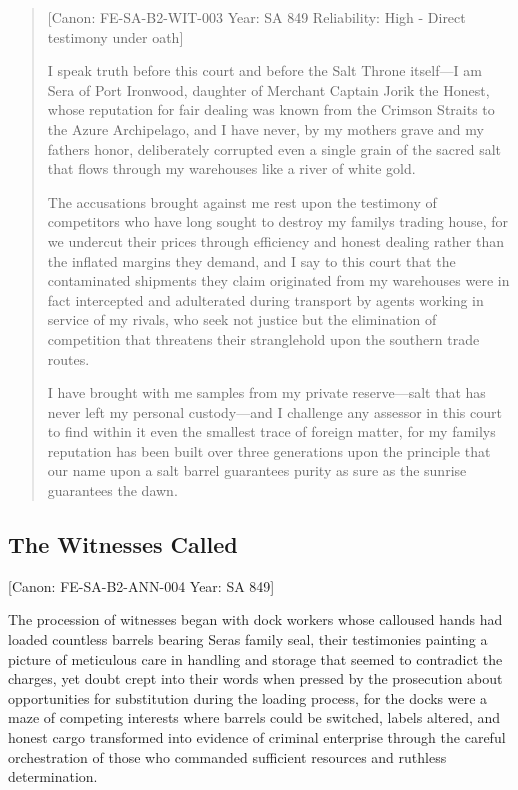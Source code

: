 \begin{quote}
{[}Canon: FE-SA-B2-WIT-003 \textbar{} Year: SA 849 \textbar{}
Reliability: High - Direct testimony under oath{]}

I speak truth before this court and before the Salt Throne itself---I am
Sera of Port Ironwood, daughter of Merchant Captain Jorik the Honest,
whose reputation for fair dealing was known from the Crimson Straits to
the Azure Archipelago, and I have never, by my mother\textquotesingle s
grave and my father\textquotesingle s honor, deliberately corrupted even
a single grain of the sacred salt that flows through my warehouses like
a river of white gold.

The accusations brought against me rest upon the testimony of
competitors who have long sought to destroy my family\textquotesingle s
trading house, for we undercut their prices through efficiency and
honest dealing rather than the inflated margins they demand, and I say
to this court that the contaminated shipments they claim originated from
my warehouses were in fact intercepted and adulterated during transport
by agents working in service of my rivals, who seek not justice but the
elimination of competition that threatens their stranglehold upon the
southern trade routes.

I have brought with me samples from my private reserve---salt that has
never left my personal custody---and I challenge any assessor in this
court to find within it even the smallest trace of foreign matter, for
my family\textquotesingle s reputation has been built over three
generations upon the principle that our name upon a salt barrel
guarantees purity as sure as the sunrise guarantees the dawn.
\end{quote}

\subsection{The Witnesses Called}\label{the-witnesses-called}

{[}Canon: FE-SA-B2-ANN-004 \textbar{} Year: SA 849{]}

The procession of witnesses began with dock workers whose calloused
hands had loaded countless barrels bearing Sera\textquotesingle s family
seal, their testimonies painting a picture of meticulous care in
handling and storage that seemed to contradict the charges, yet doubt
crept into their words when pressed by the prosecution about
opportunities for substitution during the loading process, for the docks
were a maze of competing interests where barrels could be switched,
labels altered, and honest cargo transformed into evidence of criminal
enterprise through the careful orchestration of those who commanded
sufficient resources and ruthless determination.

